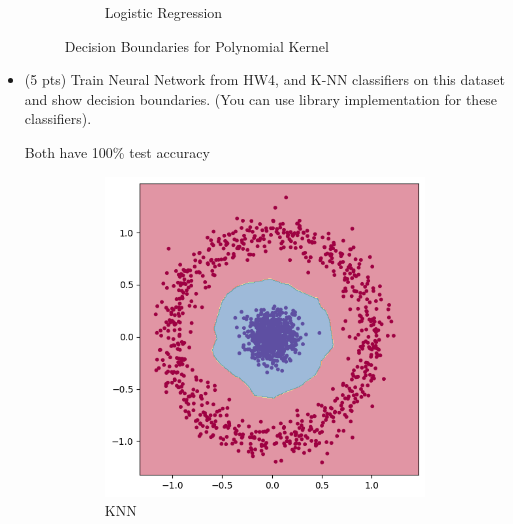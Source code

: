 \documentclass[a4paper]{article}
\theoremstyle{definition}
\newenvironment{soln}{
    \leavevmode\color{blue}\ignorespaces
}{}
\begin{document}
\begin{itemize}
\begin{soln}
\begin{figure}[H]
\begin{subfigure}[b]{0.5\textwidth}
                \caption{Logistic Regression}
            \end{subfigure}
            \caption{Decision Boundaries for Polynomial Kernel}
        \end{figure}
     \end{soln}
     
     \item (5 pts) Train Neural Network from HW4, and K-NN classifiers on this dataset and show decision boundaries. (You can use library implementation for these classifiers).
     
     \begin{soln}
        Both have 100\% test accuracy
         \begin{figure}[H]
            \centering
            \begin{subfigure}[b]{0.5\textwidth}
                \centering
                \includegraphics[scale=0.3]{Images/q2_2_3/KNN.png}
                \caption{KNN}
            \end{subfigure}%
            \begin{subfigure}[b]{0.5\textwidth}
                \centering

\end{subfigure}
\end{figure}
\end{soln}
\end{itemize}
\end{document}
